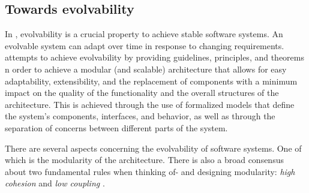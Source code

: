 \subsection{Towards evolvability} \label{sec_on_evolvability}

In \ns, evolvability is a crucial property to achieve stable software
systems. An evolvable system can adapt over time in response to changing requirements.
\ns attempts to achieve evolvability by providing guidelines, principles, and theorems
n order to achieve a modular (and scalable) architecture that allows for easy
adaptability, extensibility, and the replacement of components with a minimum impact on the
quality of the functionality and the overall structures of the architecture. This is
achieved through the use of formalized models that define the system's components,
interfaces, and behavior, as well as through the separation of concerns between different
parts of the system.

There are several aspects concerning the evolvability of software systems. One of which is
the modularity of the architecture. There is also a broad consensus about two fundamental
rules when thinking of- and designing modularity: \emph{high cohesion} and \emph{low
coupling} \autocite[22]{mannaert_normalized_2016}.